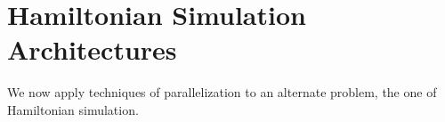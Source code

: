\chapter{Hamiltonian Simulation Architectures}
\label{chap:hamsim}

We now apply techniques of parallelization to an alternate
problem, the one of Hamiltonian simulation.



